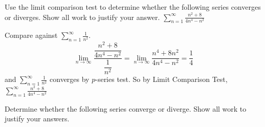\documentclass[12pt,answers]{exam}
\begin{document}
\begin{questions}
\question[7]
Use the limit comparison test to determine whether the following series converges or diverges. 
Show all work to justify your answer.
$\displaystyle \sum_{n=1}^\infty \frac{n^2+8}{4n^4-n^2}$
\begin{solution}
    Compare against $\displaystyle \sum_{n=1}^\infty \frac{1}{n^2}$.
    \[
        \lim_{n\to\infty} \frac{\dfrac{n^2+8}{4n^4-n^2}}{\dfrac{1}{n^2}}
        = 
        \lim_{n\to\infty} \frac{n^4+8n^2}{4n^4-n^2} 
        = \frac14
    \]
    and $\displaystyle \sum_{n=1}^\infty \frac{1}{n^2}$ converges by $p$-series test. 
    So by Limit Comparison Test, \\
    $\displaystyle \sum_{n=1}^\infty \frac{n^2+8}{4n^4-n^2}$ 
\end{solution}

\question
Determine whether the following series converge or diverge. Show all work to justify your answers.


\end{questions}
\end{document}
